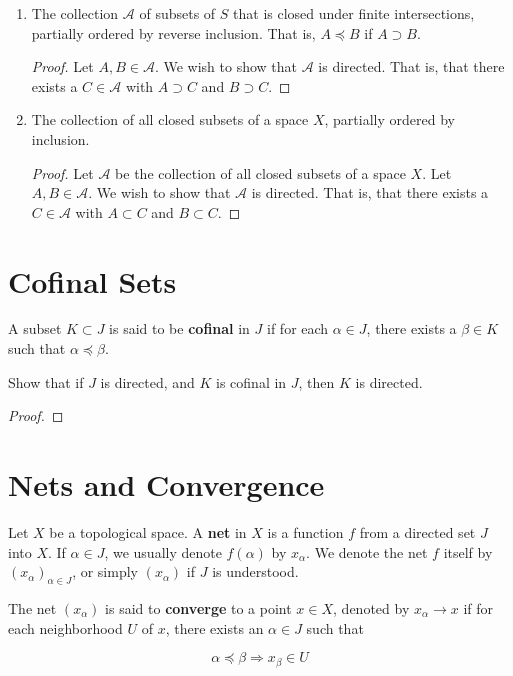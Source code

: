 \documentclass[12pt]{article}
\begin{document}
\begin{enumerate}
    \item The collection $\mathcal A$ of subsets of $S$ that is closed under finite intersections,
          partially ordered by reverse inclusion. That is, $A \preceq B$ if $A \supset B$.
          \begin{proof}
              Let $A, B \in \mathcal A$. We wish to show that $\mathcal A$ is directed. That is,
              that there exists a $C \in \mathcal A$ with $A \supset C$ and $B \supset C$.
          \end{proof}

    \item The collection of all closed subsets of a space $X$, partially ordered by inclusion.
          \begin{proof}
              Let $\mathcal A$ be the collection of all closed subsets of a space $X$. Let $A, B
                  \in \mathcal A$. We wish to show that $\mathcal A$ is directed. That is, that
              there exists a $C \in
                  \mathcal A$ with $A \subset C$ and $B \subset C$.
          \end{proof}
\end{enumerate}

\section{Cofinal Sets}
\begin{defn}
    A subset $K \subset J$ is said to be \textbf{cofinal} in $J$ if for each $\alpha \in J$, there
    exists a $\beta \in K$ such that $\alpha \preceq \beta$.
\end{defn}

Show that if $J$ is directed, and $K$ is cofinal in $J$, then $K$ is directed.

\begin{proof}
\end{proof}

\section{Nets and Convergence}
\begin{defn}
    Let $X$ be a topological space. A \textbf{net} in $X$ is a function $f$ from a directed set $J$
    into $X$. If $\alpha \in J$, we usually denote $f(\alpha)$ by $x_\alpha$. We denote the net $f$
    itself by ${\left(x_\alpha\right)}_{\alpha \in J}$, or simply $(x_\alpha)$ if $J$ is
    understood.
\end{defn}
\begin{defn}
    The net $(x_\alpha)$ is said to \textbf{converge} to a point $x \in X$, denoted by $x_\alpha
        \to x$ if for each neighborhood $U$ of $x$, there exists an $\alpha \in J$ such that

    \[\alpha \preceq \beta \Longrightarrow x_\beta \in U\]
\end{defn}
\end{document}
